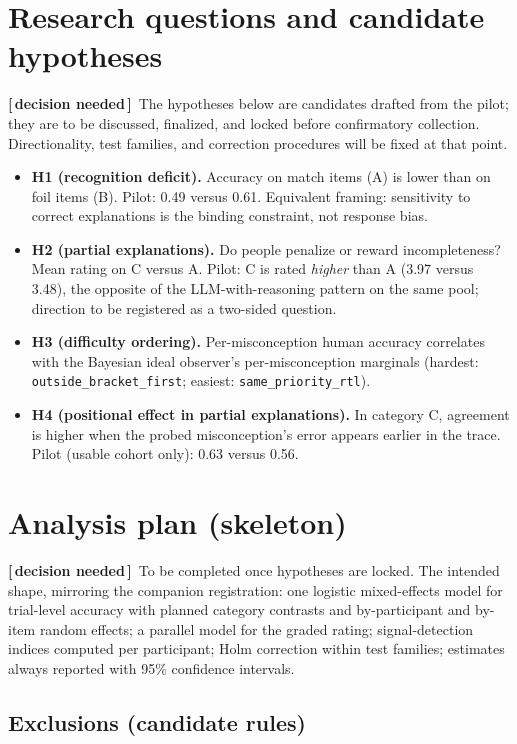 \documentclass[11pt]{article}
\newcommand{\decflag}{{\small\textbf{\textcolor{decisioncol}{[\,decision needed\,]}}}\ }
\begin{document}
\section{Research questions and candidate hypotheses}\label{sec:hyp}

\decflag The hypotheses below are candidates drafted from the pilot; they are to be discussed,
finalized, and locked before confirmatory collection. Directionality, test families, and
correction procedures will be fixed at that point.

\begin{itemize}
\item \textbf{H1 (recognition deficit).} Accuracy on match items (A) is lower than on foil
items (B). Pilot: 0.49 versus 0.61. Equivalent framing: sensitivity to correct explanations
is the binding constraint, not response bias.
\item \textbf{H2 (partial explanations).} Do people penalize or reward incompleteness? Mean
rating on C versus A. Pilot: C is rated \emph{higher} than A (3.97 versus 3.48), the opposite
of the LLM-with-reasoning pattern on the same pool; direction to be registered as a two-sided
question.
\item \textbf{H3 (difficulty ordering).} Per-misconception human accuracy correlates with the
Bayesian ideal observer's per-misconception marginals (hardest: \texttt{outside\_bracket\_first};
easiest: \texttt{same\_priority\_rtl}).
\item \textbf{H4 (positional effect in partial explanations).} In category C, agreement is
higher when the probed misconception's error appears earlier in the trace. Pilot (usable
cohort only): 0.63 versus 0.56.
\end{itemize}

\section{Analysis plan (skeleton)}\label{sec:analysis}

\decflag To be completed once hypotheses are locked. The intended shape, mirroring the
companion registration: one logistic mixed-effects model for trial-level accuracy with planned
category contrasts and by-participant and by-item random effects; a parallel model for the
graded rating; signal-detection indices computed per participant; Holm correction within test
families; estimates always reported with 95\% confidence intervals.

\subsection{Exclusions (candidate rules)}\label{sec:excl}
\end{document}
